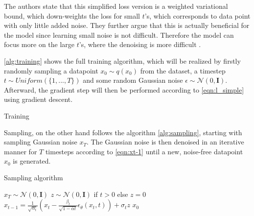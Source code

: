 The authors \cite{ho2020DenoisingDiffusionProbabilistic} state that this simplified loss version is a weighted variational bound, which down-weights the loss for small $t$'s, which corresponds to data point with only little added noise.
They further argue that this is actually beneficial for the model since learning small noise is not difficult. 
Therefore the model can focus more on the large $t$'s, where the denoising is more difficult \cite{ho2020DenoisingDiffusionProbabilistic}.

\autoref{alg:training} shows the full training algorithm, which will be realized by firstly randomly sampling a datapoint $x_0 \sim q(x_0)$ from the dataset, a timestep $t\sim Uniform(\{1, ..., T\})$ and some random Gaussian noise $\epsilon \sim \mathcal{N}(0, \textbf{I})$.
Afterward, the gradient step will then be performed according to \autoref{eqn:l_simple} using gradient descent.

\begin{algorithm}
  \caption[Training algorithm]{Training \cite[p. 4]{ho2020DenoisingDiffusionProbabilistic}}
  \label{alg:training}
\end{algorithm}


Sampling, on the other hand follows the algorithm \autoref{alg:sampling}, starting with sampling Gaussian noise $x_T$.
The Gaussian noise is then denoised in an iterative manner for $T$ timesteps according to \autoref{eqn:xt-1} until a new, noise-free datapoint $x_0$ is generated.

\begin{algorithm}
\caption[Sampling algorithm]{Sampling algorithm \cite[p. 4]{ho2020DenoisingDiffusionProbabilistic}}
  \label{alg:sampling}
  \begin{algorithmic}
  \State $x_T \sim \mathcal{N}(0, \mathbf{I})$
  \State $z \sim \mathcal{N}(0, \mathbf{I})$ if $t > 0$ else $z = 0$
  \State $x_{t-1} = \frac{1}{\sqrt{\alpha_t}}\left(x_t - \frac{\beta_t}{\sqrt{1-\bar{\alpha}t}}\epsilon_{\theta}(x_t,t)\right) + \sigma_t z$
  \EndFor
  \State \Return $x_0$
  \end{algorithmic}
\end{algorithm}

